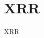 \documentclass[\main/dresen_thesis.tex]{subfiles}
\begin{document}
  \section{XRR}
    \label{app:methods:xrr}
    XRR
\end{document}
